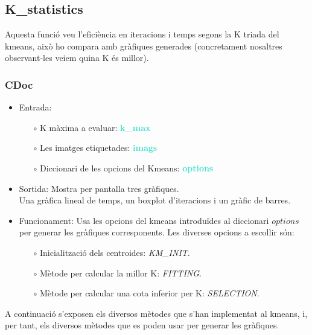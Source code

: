 \documentclass[a4paper, 11pt]{article}
\begin{document}
\newpage


\subsection{K\_statistics}

Aquesta funció veu l’eficiència en iteracions i temps segons la K triada del kmeans, això ho compara amb gràfiques generades (concretament nosaltres observant-les veiem quina K és millor).
\subsubsection{CDoc}

\begin{itemize}
     \item Entrada: 
    \begin{itemize}
        \item[$\circ$] K màxima a evaluar: \textbf{\textcolor{Turquoise}{k\_max}}
        \item[$\circ$] Les imatges etiquetades: \textbf{\textcolor{Turquoise}{imags}}
         \item[$\circ$] Diccionari de les opcions del Kmeans:
         \textbf{\textcolor{Turquoise}{options}}
    \end{itemize}
    \item Sortida: Mostra per pantalla tres gràfiques.\\
Una gràfica lineal de temps, un boxplot d'iteracions i un gràfic de barres.
    \item Funcionament: 
    Usa les opcions del kmeans introduïdes al diccionari $options$ per generar les gràfiques corresponents. Les diverses opcions a escollir són:
    
    \begin{itemize}
        \item[$\circ$] Inicialització dels centroides: \textit{KM\_INIT}.
        \item[$\circ$] Mètode per calcular la millor K: \textit{FITTING}.
        \item[$\circ$] Mètode per calcular una cota inferior per K: \textit{SELECTION}.
    \end{itemize}
    
\end{itemize}
A continuació s'exposen els diversos mètodes que s'han implementat al kmeans, i, per tant, els diversos mètodes que es poden usar per generar les gràfiques.\\\\
\end{document}
